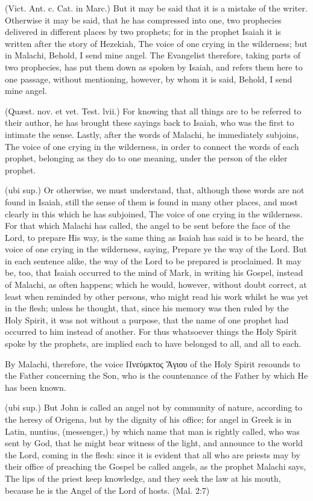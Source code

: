  (Vict. Ant. c. Cat. in Marc.) But it may be said that it is a mistake of the writer. Otherwise it may be said, that he has compressed into one, two prophecies delivered in different places by two prophets; for in the prophet Isaiah it is written after the story of Hezekiah, The voice of one crying in the wilderness; but in Malachi, Behold, I send mine angel. The Evangelist therefore, taking parts of two prophecies, has put them down as spoken by Isaiah, and refers them here to one passage, without mentioning, however, by whom it is said, Behold, I send mine angel.

 (Quæst. nov. et vet. Test. lvii.) For knowing that all things are to be referred to their author, he has brought these sayings back to Isaiah, who was the first to intimate the sense. Lastly, after the words of Malachi, he immediately subjoins, The voice of one crying in the wilderness, in order to connect the words of each prophet, belonging as they do to one meaning, under the person of the elder prophet.

 (ubi sup.) Or otherwise, we must understand, that, although these words are not found in Isaiah, still the sense of them is found in many other places, and most clearly in this which he has subjoined, The voice of one crying in the wilderness. For that which Malachi has called, the angel to be sent before the face of the Lord, to prepare His way, is the same thing as Isaiah has said is to be heard, the voice of one crying in the wilderness, saying, Prepare ye the way of the Lord. But in each sentence alike, the way of the Lord to be prepared is proclaimed. It may be, too, that Isaiah occurred to the mind of Mark, in writing his Gospel, instead of Malachi, as often happens; which he would, however, without doubt correct, at least when reminded by other persons, who might read his work whilst he was yet in the flesh; unless he thought, that, since his memory was then ruled by the Holy Spirit, it was not without a purpose, that the name of one prophet had occurred to him instead of another. For thus whatsoever things the Holy Spirit spoke by the prophets, are implied each to have belonged to all, and all to each.

 By Malachi, therefore, the voice \textgreek{Πνεύμκτος Ἅγιου} of the Holy Spirit resounds to the Father concerning the Son, who is the countenance of the Father by which He has been known.

 (ubi sup.) But John is called an angel not by community of nature, according to the heresy of Origena, but by the dignity of his office; for angel in Greek is in Latin, nuntius, (messenger,) by which name that man is rightly called, who was sent by God, that he might bear witness of the light, and announce to the world the Lord, coming in the flesh: since it is evident that all who are priests may by their office of preaching the Gospel be called angels, as the prophet Malachi says, The lips of the priest keep knowledge, and they seek the law at his mouth, because he is the Angel of the Lord of hosts. (Mal. 2:7)

